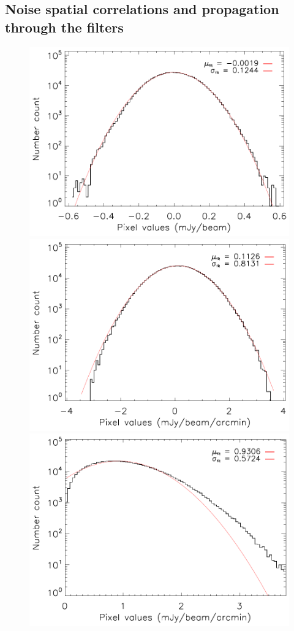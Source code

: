 \documentclass[twocolumn,traditabstract]{aa}
\begin{document}
\subsection{Noise spatial correlations and propagation through the filters}
\begin{figure}[h]
\centering
\includegraphics[trim=0cm 0cm 0cm 0cm, clip=true, totalheight=4.2cm]{Figure/DoG_noise_stat_CLJ1227.pdf}
\includegraphics[trim=0cm 0cm 0cm 0cm, clip=true, totalheight=4.2cm]{Figure/GGM_noise_stat_CLJ1227.pdf}
\includegraphics[trim=0cm 0cm 0cm 0cm, clip=true, totalheight=4.2cm]{Figure/GGM_noise_stat_CLJ1227_NoSignal.pdf}

\end{figure}
\end{document}
